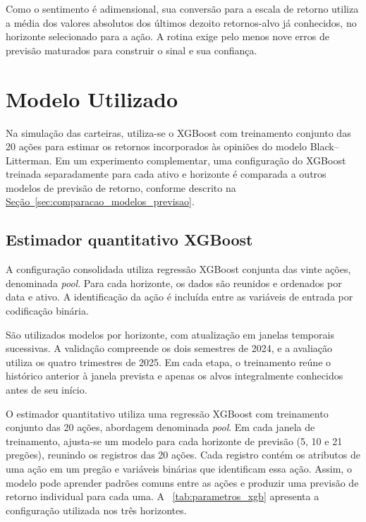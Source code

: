 Como o sentimento é adimensional, sua conversão para
a escala de retorno utiliza a média dos valores
absolutos dos últimos dezoito retornos-alvo já
conhecidos, no horizonte selecionado para a ação.
A rotina exige pelo menos nove erros de previsão
maturados para construir o sinal e sua confiança.

\section{Modelo Utilizado}
\label{sec:modelos_utilizados}

Na simulação das carteiras, utiliza-se o XGBoost com treinamento conjunto das 20 ações para estimar os retornos incorporados às opiniões do modelo Black--Litterman. Em um experimento complementar, uma configuração do XGBoost treinada separadamente para cada ativo e horizonte é comparada a outros modelos de previsão de retorno, conforme descrito na \hyperref[sec:comparacao_modelos_previsao]{Seção~\ref*{sec:comparacao_modelos_previsao}}.

\subsection{Estimador quantitativo XGBoost}
\label{sec:estimador_xgb}

A configuração consolidada utiliza regressão XGBoost
conjunta das vinte ações, denominada \emph{pool}.
Para cada horizonte, os dados são reunidos e ordenados
por data e ativo. A identificação da ação é incluída
entre as variáveis de entrada por codificação binária.

São utilizados modelos por horizonte, com atualização
em janelas temporais sucessivas. A validação compreende
os dois semestres de 2024, e a avaliação utiliza os
quatro trimestres de 2025. Em cada etapa, o treinamento
reúne o histórico anterior à janela prevista e apenas
os alvos integralmente conhecidos antes de seu início.

O estimador quantitativo utiliza uma regressão XGBoost
com treinamento conjunto das 20 ações, abordagem
denominada \emph{pool}. Em cada janela de treinamento,
ajusta-se um modelo para cada horizonte de previsão
(5, 10 e 21 pregões), reunindo os registros das 20 ações.
Cada registro contém os atributos de uma ação em um
pregão e variáveis binárias que identificam essa ação.
Assim, o modelo pode aprender padrões comuns entre
as ações e produzir uma previsão de retorno individual
para cada uma. A ~\ref{tab:parametros_xgb}
apresenta a configuração utilizada nos três horizontes.

